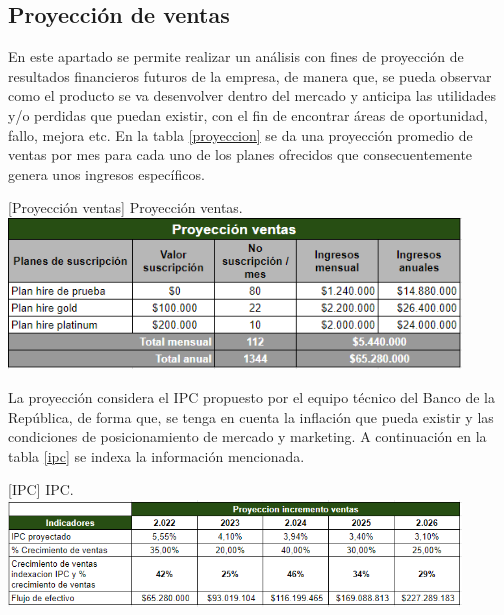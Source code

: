 \subsection{Proyección de ventas}

En este apartado se permite realizar un análisis con fines de proyección de resultados financieros futuros de la empresa, de manera que, se pueda observar como el producto se va desenvolver dentro del mercado y anticipa las utilidades y/o perdidas que puedan existir, con el fin de encontrar áreas de oportunidad, fallo, mejora etc. En la tabla \ref{proyeccion} se da una proyección promedio de ventas por mes para cada uno de los planes ofrecidos que consecuentemente genera unos ingresos específicos.

\vspace{2mm}
\begin{minipage}{0.9\textwidth}
\centering
{}[{Proyección ventas}]{ Proyección ventas. }
\label{proyeccion}
\includegraphics[width=0.9\textwidth]{Images/proyeccionVentas2.png}
\end{minipage}

La proyección considera el IPC propuesto por el equipo técnico del Banco de la República, de forma que, se tenga en cuenta la inflación que pueda existir y las condiciones de posicionamiento de mercado y marketing. A continuación en la tabla \ref{ipc} se indexa la información mencionada.

\vspace{2mm}
\begin{minipage}{0.9\textwidth}
\centering
{}[{IPC}]{ IPC. }
\label{ipc}
\includegraphics[width=0.9\textwidth]{Images/IPC.png}
\end{minipage}